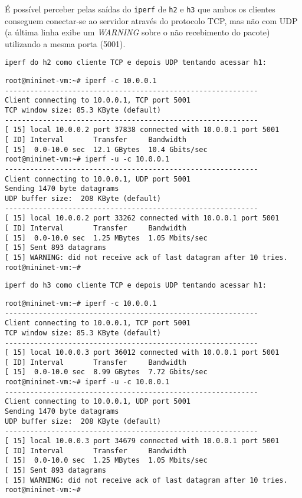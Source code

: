 \documentclass[12pt,letterpaper]{article}
\begin{document}
É possível perceber pelas saídas do \texttt{iperf} de \texttt{h2} e \texttt{h3} que ambos os clientes conseguem conectar-se ao servidor através do protocolo TCP, mas não com UDP (a última linha exibe um \textit{WARNING} sobre o não recebimento do pacote) utilizando a mesma porta (5001).

\begin{verbatim}
iperf do h2 como cliente TCP e depois UDP tentando acessar h1:
\end{verbatim}

\begin{tiny}
\begin{verbatim}
root@mininet-vm:~# iperf -c 10.0.0.1
------------------------------------------------------------
Client connecting to 10.0.0.1, TCP port 5001
TCP window size: 85.3 KByte (default)
------------------------------------------------------------
[ 15] local 10.0.0.2 port 37838 connected with 10.0.0.1 port 5001
[ ID] Interval       Transfer     Bandwidth
[ 15]  0.0-10.0 sec  12.1 GBytes  10.4 Gbits/sec
root@mininet-vm:~# iperf -u -c 10.0.0.1
------------------------------------------------------------
Client connecting to 10.0.0.1, UDP port 5001
Sending 1470 byte datagrams
UDP buffer size:  208 KByte (default)
------------------------------------------------------------
[ 15] local 10.0.0.2 port 33262 connected with 10.0.0.1 port 5001
[ ID] Interval       Transfer     Bandwidth
[ 15]  0.0-10.0 sec  1.25 MBytes  1.05 Mbits/sec
[ 15] Sent 893 datagrams
[ 15] WARNING: did not receive ack of last datagram after 10 tries.
root@mininet-vm:~# 
\end{verbatim}
\end{tiny}

\begin{verbatim}
iperf do h3 como cliente TCP e depois UDP tentando acessar h1:
\end{verbatim}

\begin{tiny}
\begin{verbatim}
root@mininet-vm:~# iperf -c 10.0.0.1
------------------------------------------------------------
Client connecting to 10.0.0.1, TCP port 5001
TCP window size: 85.3 KByte (default)
------------------------------------------------------------
[ 15] local 10.0.0.3 port 36012 connected with 10.0.0.1 port 5001
[ ID] Interval       Transfer     Bandwidth
[ 15]  0.0-10.0 sec  8.99 GBytes  7.72 Gbits/sec
root@mininet-vm:~# iperf -u -c 10.0.0.1
------------------------------------------------------------
Client connecting to 10.0.0.1, UDP port 5001
Sending 1470 byte datagrams
UDP buffer size:  208 KByte (default)
------------------------------------------------------------
[ 15] local 10.0.0.3 port 34679 connected with 10.0.0.1 port 5001
[ ID] Interval       Transfer     Bandwidth
[ 15]  0.0-10.0 sec  1.25 MBytes  1.05 Mbits/sec
[ 15] Sent 893 datagrams
[ 15] WARNING: did not receive ack of last datagram after 10 tries.
root@mininet-vm:~# 
\end{verbatim}
\end{tiny}
\end{document}
